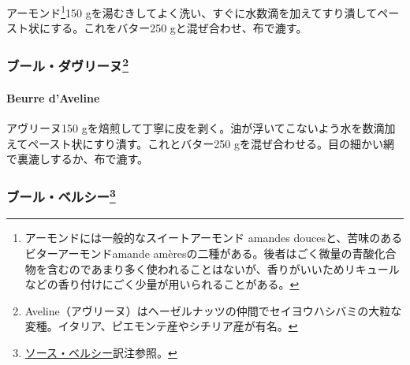\begin{recette}
アーモンド\footnote{アーモンドには一般的なスイートアーモンド amandes
  doucesと、苦味のあるビターアーモンドamande
  amèresの二種がある。後者はごく微量の青酸化合物を含むのであまり多く使われることはないが、香りがいいためリキュールなどの香り付けにごく少量が用いられることがある。}150
gを湯むきしてよく洗い、すぐに水数滴を加えてすり潰してペースト状にする。これをバター250
gと混ぜ合わせ、布で漉す。

\hypertarget{ux30d6ux30fcux30ebux30c0ux30f4ux30eaux30fcux30cc8}{%
\subsubsection[ブール・ダヴリーヌ]{\texorpdfstring{ブール・ダヴリーヌ\footnote{Aveline（アヴリーヌ）はヘーゼルナッツの仲間でセイヨウハシバミの大粒な変種。イタリア、ピエモンテ産やシチリア産が有名。}}{ブール・ダヴリーヌ}}\label{ux30d6ux30fcux30ebux30c0ux30f4ux30eaux30fcux30cc8}}

\hypertarget{beurre-d-aveline}{%
\paragraph{Beurre d'Aveline}\label{beurre-d-aveline}}


アヴリーヌ150
gを焙煎して丁寧に皮を剥く。油が浮いてこないよう水を数滴加えてペースト状にすり潰す。これとバター250
gを混ぜ合わせる。目の細かい網で裏漉しするか、布で漉す。

\hypertarget{beurre-bercy}{%
\subsubsection[ブール・ベルシー]{\texorpdfstring{ブール・ベルシー\footnote{\protect\hyperlink{sauce-bercy}{ソース・ベルシー}訳注参照。}}{ブール・ベルシー}}\label{beurre-bercy}}




\end{recette}
